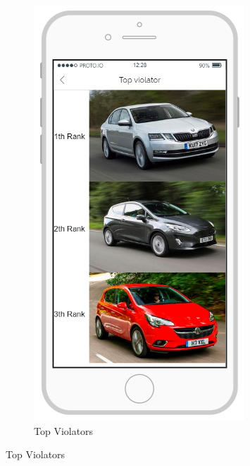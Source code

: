 \documentclass{article}
\begin{document}
\begin{figure}[H]
			\begin{subfigure}[H]{0.49\linewidth}
				\includegraphics[width=\linewidth]{images/Top_Violators.png}
				\caption{Top Violators}
			\end{subfigure}
		\end{figure}			
\end{document}
